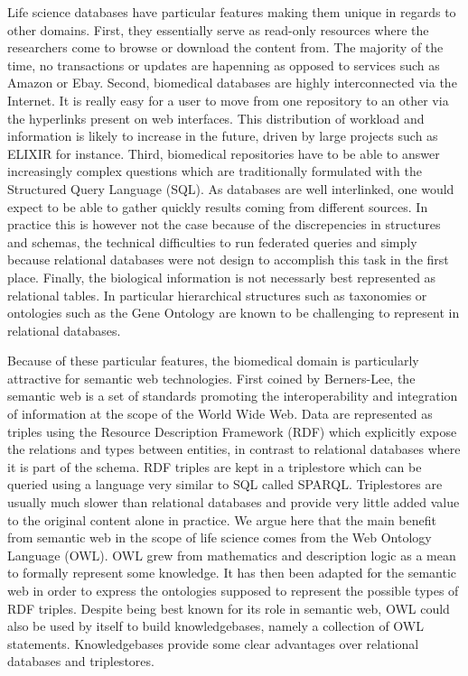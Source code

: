 \documentclass{bioinfo}
\begin{document}
Life science databases have particular features making them unique in regards to other domains. First, they essentially serve as read-only 
resources where the researchers come to browse or download the content from. The majority of the time, no transactions or updates 
are hapenning as opposed to services such as Amazon or Ebay. Second, biomedical databases are highly interconnected via the Internet. 
It is really easy for a user to move from one repository to an other via the hyperlinks present on web interfaces. This distribution of workload 
and information is likely to increase in the future, driven by large projects such as ELIXIR for instance.
Third, biomedical repositories have to be able to answer increasingly complex questions which 
are traditionally formulated with the Structured Query Language (SQL). As databases are well interlinked, one would expect to be able to
gather quickly results coming from different sources. In practice this is however not the case because of the discrepencies in 
structures and schemas, the technical difficulties to run federated queries and simply because relational databases were not design to 
accomplish this task in the first place. Finally, the biological information is not necessarly best represented as relational tables. 
In particular hierarchical structures such as taxonomies or ontologies such as the Gene Ontology are known to be challenging 
to represent in relational databases. 

Because of these particular features, the biomedical domain is particularly attractive for semantic web technologies. First coined by 
Berners-Lee, the semantic web is a set of standards promoting the interoperability and integration of information at the scope of the World Wide
Web. Data are represented as triples using the Resource Description Framework (RDF) which explicitly expose the relations and types between
entities, in contrast to relational databases where it is part of the schema. RDF triples are kept in a triplestore
which can be queried using a language very similar to SQL called SPARQL. Triplestores are usually much slower than relational databases and
provide very little added value to the original content alone in practice. We argue here that the main benefit from semantic web in the scope 
of life science comes from the Web Ontology Language (OWL). OWL grew from mathematics and description logic as a mean to formally represent some 
knowledge. It has then been adapted for the semantic web in order to express the ontologies supposed to represent the possible types of RDF 
triples. Despite being best known for its role in semantic web, OWL could also be used by itself to build knowledgebases, namely a collection 
of OWL statements. Knowledgebases provide some clear advantages over relational databases and triplestores.
\end{document}
